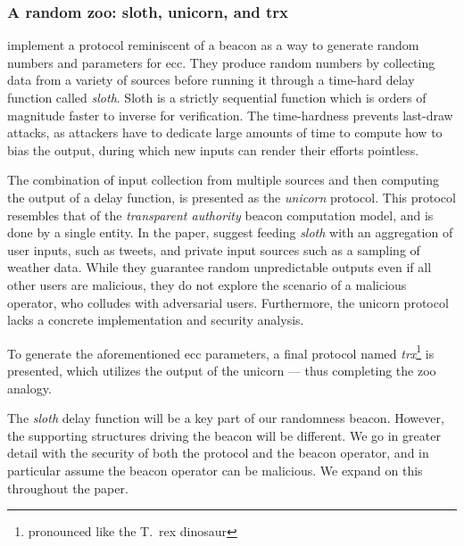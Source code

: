 \subsubsection{A random zoo: sloth, unicorn, and trx}%
\label{sub:random_zoo}
\citet{randomzoo} implement a protocol reminiscent of a beacon as a way to generate random numbers and parameters for \gls{ecc}.
They produce random numbers by collecting data from a variety of sources before running it through a time-hard delay function called \textit{sloth}.
Sloth is a strictly sequential function which is orders of magnitude faster to inverse for verification.
The time-hardness prevents last-draw attacks, as attackers have to dedicate large amounts of time to compute how to bias the output, during which new inputs can render their efforts pointless.

The combination of input collection from multiple sources and then computing the output of a delay function, is presented as the \textit{unicorn} protocol.
This protocol resembles that of the \emph{transparent authority} beacon computation model, and is done by a single entity.
In the paper, \citeauthor{randomzoo} suggest feeding \textit{sloth} with an aggregation of user inputs, such as tweets, and private input sources such as a sampling of weather data.
While they guarantee random unpredictable outputs even if all other users are malicious, they do not explore the scenario of a malicious operator, who colludes with adversarial users.
Furthermore, the unicorn protocol lacks a concrete implementation and security analysis.

To generate the aforementioned \gls{ecc} parameters, a final protocol named \textit{trx}\footnote{pronounced like the T.\ rex dinosaur} is presented, which utilizes the output of the unicorn --- thus completing the zoo analogy.

The \emph{sloth} delay function will be a key part of our randomness beacon.
However, the supporting structures driving the beacon will be different.
We go in greater detail with the security of both the protocol and the beacon operator, and in particular assume the beacon operator can be malicious.
We expand on this throughout the paper.

